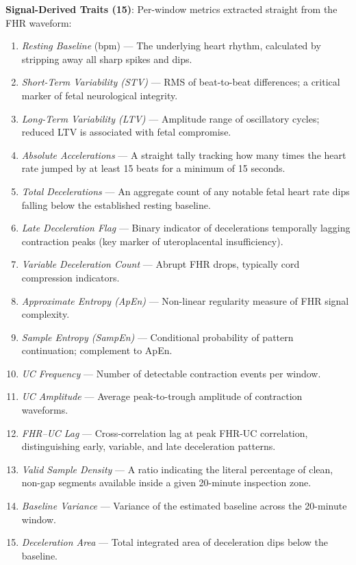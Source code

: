 \documentclass[conference]{IEEEtran}
\begin{document}
\textbf{Signal-Derived Traits (15)}: Per-window metrics extracted straight from the FHR waveform:
\begin{enumerate}
    \item \textit{Resting Baseline} (bpm) — The underlying heart rhythm, calculated by stripping away all sharp spikes and dips.
    \item \textit{Short-Term Variability (STV)} — RMS of beat-to-beat
    differences; a critical marker of fetal neurological integrity.
    \item \textit{Long-Term Variability (LTV)} — Amplitude range of
    oscillatory cycles; reduced LTV is associated with fetal compromise.
    \item \textit{Absolute Accelerations} — A straight tally tracking how many times the heart rate jumped by at least 15 beats for a minimum of 15 seconds.
    \item \textit{Total Decelerations} — An aggregate count of any notable fetal heart rate dips falling below the established resting baseline.
    \item \textit{Late Deceleration Flag} — Binary indicator of decelerations
    temporally lagging contraction peaks (key marker of uteroplacental
    insufficiency).
    \item \textit{Variable Deceleration Count} — Abrupt FHR drops, typically
    cord compression indicators.
    \item \textit{Approximate Entropy (ApEn)} — Non-linear regularity measure
    of FHR signal complexity.
    \item \textit{Sample Entropy (SampEn)} — Conditional probability of
    pattern continuation; complement to ApEn.
    \item \textit{UC Frequency} — Number of detectable contraction events per
    window.
    \item \textit{UC Amplitude} — Average peak-to-trough amplitude of
    contraction waveforms.
    \item \textit{FHR–UC Lag} — Cross-correlation lag at peak FHR-UC
    correlation, distinguishing early, variable, and late deceleration
    patterns.
    \item \textit{Valid Sample Density} — A ratio indicating the literal percentage of clean, non-gap segments available inside a given 20-minute inspection zone.
    \item \textit{Baseline Variance} — Variance of the estimated baseline across the 20-minute window.
    \item \textit{Deceleration Area} — Total integrated area of deceleration dips below the baseline.
\end{enumerate}
\end{document}
